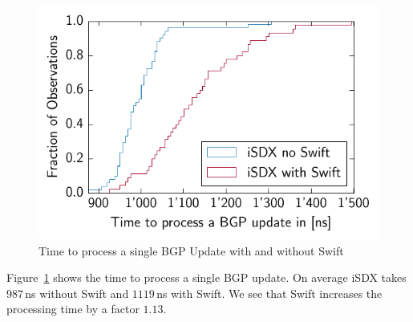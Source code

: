 \begin{figure}[h]
\center
\includegraphics[scale = 1]{Figures/cdf.pdf}
\caption{Time to process a single BGP Update with and without Swift}
\label{fig:swiftoverhead}
\end{figure}

Figure~\ref{fig:swiftoverhead} shows the time to process a single BGP update. On average iSDX takes $987$\,ns without Swift and $1119$\,ns with Swift. We see that Swift increases the processing time by a factor $1.13$.

\newpage